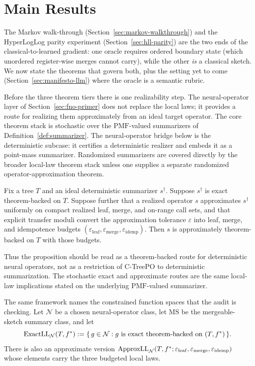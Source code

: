\section{Main Results}\label{sec:theorems}

The Markov walk-through (Section~\ref{sec:markov-walkthrough}) and the
HyperLogLog parity experiment (Section~\ref{sec:hll-parity}) are the two
ends of the classical-to-learned gradient: one oracle requires ordered
boundary state (which unordered register-wise merges cannot carry),
while the other \emph{is} a classical sketch. We now state the theorems that govern
both, plus the setting yet to come
(Section~\ref{sec:manifesto-llm}) where the oracle is a semantic rubric.

Before the three theorem tiers there is one realizability step. The
neural-operator layer of Section~\ref{sec:fno-primer} does not replace
the local laws; it provides a route for realizing them approximately
from an ideal target operator. The core theorem stack is stochastic
over the $\mathrm{PMF}$-valued summarizers of Definition~\ref{def:summarizer}.
The neural-operator bridge below is the deterministic subcase: it
certifies a deterministic realizer and embeds it as a point-mass
summarizer. Randomized summarizers are covered directly by the broader
local-law theorem stack unless one supplies a separate randomized
operator-approximation theorem.

\begin{proposition}\label{prop:neural-operator-bridge}
Fix a tree $T$ and an ideal deterministic summarizer $s^\dagger$.
Suppose $s^\dagger$ is exact theorem-backed on $T$. Suppose further that
a realized operator $s$ approximates $s^\dagger$ uniformly on compact
realized leaf, merge, and on-range call sets, and that explicit
transfer moduli convert the approximation tolerance $\varepsilon$ into
leaf, merge, and idempotence budgets
$(\varepsilon_{\mathrm{leaf}}, \varepsilon_{\mathrm{merge}},
\varepsilon_{\mathrm{idemp}})$. Then $s$ is approximately
theorem-backed on $T$ with those budgets.
\end{proposition}

Thus the proposition should be read as a theorem-backed route for
deterministic neural operators, not as a restriction of C-TreePO to
deterministic summarization. The stochastic exact and approximate
routes are the same local-law implications stated on the underlying
$\mathrm{PMF}$-valued summarizer.

The same framework names the constrained function spaces that the
audit is checking. Let $\mathcal{N}$ be a chosen neural-operator class,
let $\mathrm{MS}$ be the mergeable-sketch summary class, and let
\[
\mathrm{ExactLL}_{\mathcal{N}}(T,f^\ast)
  := \{\,g\in\mathcal{N}: g \text{ is exact theorem-backed on }(T,f^\ast)\,\}.
\]
There is also an approximate version
$\mathrm{ApproxLL}_{\mathcal{N}}(T,f^\ast;\varepsilon_{\mathrm{leaf}},
\varepsilon_{\mathrm{merge}},\varepsilon_{\mathrm{idemp}})$ whose elements carry
the three budgeted local laws.

